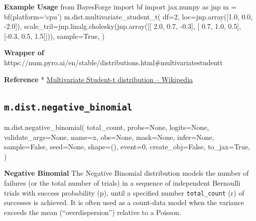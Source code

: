 \documentclass[
  letterpaper,
  DIV=11,
  numbers=noendperiod]{scrartcl}
\newenvironment{Shaded}{\begin{snugshade}}{\end{snugshade}}
\newcommand{\DecValTok}[1]{\textcolor[rgb]{0.68,0.00,0.00}{#1}}
\newcommand{\NormalTok}[1]{\textcolor[rgb]{0.00,0.23,0.31}{#1}}
\newcommand{\OperatorTok}[1]{\textcolor[rgb]{0.37,0.37,0.37}{#1}}
\newcommand{\StringTok}[1]{\textcolor[rgb]{0.13,0.47,0.30}{#1}}
\newcommand{\VariableTok}[1]{\textcolor[rgb]{0.07,0.07,0.07}{#1}}
\begin{document}
\textbf{Example Usage} from BayesForge import bf import jax.numpy as jnp
m = bf(platform=`cpu') m.dist.multivariate\_student\_t( df=2,
loc=jnp.array({[}1.0, 0.0, -2.0{]}),
scale\_tril=jnp.linalg.cholesky(jnp.array({[}{[} 2.0, 0.7, -0.3{]}, {[}
0.7, 1.0, 0.5{]}, {[}-0.3, 0.5, 1.5{]}{]})), sample=True, )

\textbf{Wrapper of}
https://num.pyro.ai/en/stable/distributions.html\#multivariatestudentt

\textbf{Reference} *
\href{https://en.wikipedia.org/wiki/Multivariate_Student\%27s_t-distribution}{Multivariate
Student-t distribution -- Wikipedia}

\subsection{\texorpdfstring{\texttt{m.dist.negative\_binomial}}{m.dist.negative\_binomial}}\label{negative_binomial}

\begin{Shaded}
\begin{Highlighting}[]
\NormalTok{m.dist.negative\_binomial(}
\NormalTok{    total\_count,}
\NormalTok{    probs}\OperatorTok{=}\VariableTok{None}\NormalTok{,}
\NormalTok{    logits}\OperatorTok{=}\VariableTok{None}\NormalTok{,}
\NormalTok{    validate\_args}\OperatorTok{=}\VariableTok{None}\NormalTok{,}
\NormalTok{    name}\OperatorTok{=}\StringTok{\textquotesingle{}x\textquotesingle{}}\NormalTok{,}
\NormalTok{    obs}\OperatorTok{=}\VariableTok{None}\NormalTok{,}
\NormalTok{    mask}\OperatorTok{=}\VariableTok{None}\NormalTok{,}
\NormalTok{    infer}\OperatorTok{=}\VariableTok{None}\NormalTok{,}
\NormalTok{    sample}\OperatorTok{=}\VariableTok{False}\NormalTok{,}
\NormalTok{    seed}\OperatorTok{=}\VariableTok{None}\NormalTok{,}
\NormalTok{    shape}\OperatorTok{=}\NormalTok{(),}
\NormalTok{    event}\OperatorTok{=}\DecValTok{0}\NormalTok{,}
\NormalTok{    create\_obj}\OperatorTok{=}\VariableTok{False}\NormalTok{,}
\NormalTok{    to\_jax}\OperatorTok{=}\VariableTok{True}\NormalTok{,}
\NormalTok{)}
\end{Highlighting}
\end{Shaded}

\textbf{Negative Binomial} The Negative Binomial distribution models the
number of failures (or the total number of trials) in a sequence of
independent Bernoulli trials with success probability (p), until a
specified number \texttt{total\_count} (r) of successes is achieved. It
is often used as a count-data model when the variance exceeds the mean
(``overdispersion'') relative to a Poisson.
\end{document}
